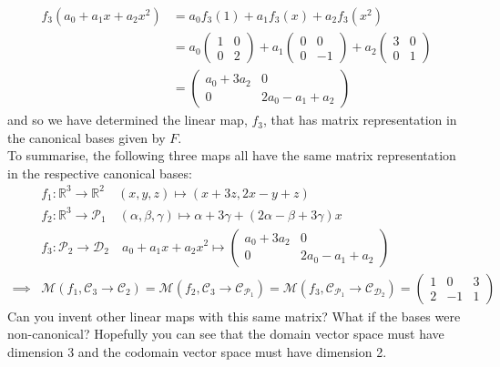 {\begin{align*}
f_3(a_0 + a_1 x + a_2 x^2) &= a_0 f_3(1) + a_1 f_3(x) + a_2 f_3(x^2) \\
           &= a_0 \begin{pmatrix} 1 & 0 \\ 0 & 2 \end{pmatrix} + a_1 \begin{pmatrix} 0 & 0 \\ 0 & -1 \end{pmatrix} + a_2 \begin{pmatrix} 3 & 0 \\ 0 & 1 \end{pmatrix} \\
           &= \begin{pmatrix} a_0 + 3 a_2 & 0 \\ 0 & 2a_0-a_1 + a_2 \end{pmatrix}
\end{align*}
and so we have determined the linear map, $f_3$, that has matrix representation in the canonical bases given by $F$. \\

\noindent To summarise, the following three maps all have the same matrix representation in the respective canonical bases:
\begin{align*}
& f_1: \mathbb{R}^3 \to \mathbb{R}^2 \quad (x,y,z) \mapsto (x+3z,2x-y+z) \\
& f_2: \mathbb{R}^3 \to \mathcal{P}_1 \quad (\alpha,\beta,\gamma) \mapsto \alpha + 3\gamma + (2\alpha - \beta + 3\gamma)x \\
& f_3: \mathcal{P}_2 \to \mathcal{D}_2 \quad a_0 + a_1 x + a_2 x^2 \mapsto \begin{pmatrix} a_0 + 3 a_2 & 0 \\ 0 & 2a_0-a_1 + a_2 \end{pmatrix} \\
\implies & \mathcal{M}(f_1,\mathcal{C}_3 \to \mathcal{C}_2)
= \mathcal{M}(f_2,\mathcal{C}_3 \to \mathcal{C}_{\mathcal{P}_1})
= \mathcal{M}(f_3,\mathcal{C}_{\mathcal{P}_1} \to \mathcal{C}_{\mathcal{D}_2})
= \begin{pmatrix}
  1 &  0 &  3 \\
  2 & -1 &  1 
\end{pmatrix}
\end{align*}
Can you invent other linear maps with this same matrix? What if the bases were non-canonical? Hopefully you can see that the domain vector space must have dimension 3 and the codomain vector space must have dimension 2.
}


